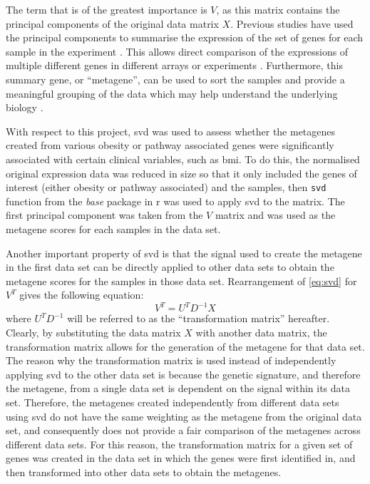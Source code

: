 The term that is of the greatest importance is $V$, as this matrix contains the principal components of the original data matrix $X$.
Previous studies have used the principal components to summarise the expression of the set of genes for each sample in the experiment \citep{Alter2000,West2001}.
This allows direct comparison of the expressions of multiple different genes in different arrays or experiments \citep{Alter2000}.
Furthermore, this summary gene, or ``metagene'', can be used to sort the samples and provide a meaningful grouping of the data which may help understand the underlying biology \citep{Alter2000}.

With respect to this project, \gls{svd} was used to assess whether the metagenes created from various obesity or pathway associated genes were significantly associated with certain clinical variables, such as \gls{bmi}.
To do this, the normalised original expression data was reduced in size so that it only included the genes of interest (either obesity or pathway associated) and the samples, then \texttt{svd} function from the \textit{base} package in \gls{r} was used to apply \gls{svd} to the matrix.
The first principal component was taken from the $V$ matrix and was used as the metagene scores for each samples in the data set.

Another important property of \gls{svd} is that the signal used to create the metagene in the first data set can be directly applied to other data sets to obtain the metagene scores for the samples in those data set.
Rearrangement of \cref{eq:svd} for $V^T$ gives the following equation:
\begin{equation}
	\label{eq:transmat}
	V^T = U^{T}D^{-1}X
\end{equation}
where $U^{T}D^{-1}$ will be referred to as the ``transformation matrix'' hereafter.
Clearly, by substituting the data matrix $X$ with another data matrix, the transformation matrix allows for the generation of the metagene for that data set.
The reason why the transformation matrix is used instead of independently applying \gls{svd} to the other data set is because the genetic signature, and therefore the metagene, from a single data set is dependent on the signal within its data set.
Therefore, the metagenes created independently from different data sets using \gls{svd} do not have the same weighting as the metagene from the original data set, and consequently does not provide a fair comparison of the metagenes across different data sets.
For this reason, the transformation matrix for a given set of genes was created in the data set in which the genes were first identified in, and then transformed into other data sets to obtain the metagenes.

